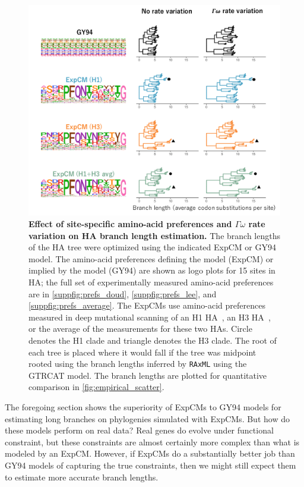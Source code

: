 \documentclass[11pt]{article}
\begin{document}
\begin{figure}
\centerline{\includegraphics[width=\textwidth]{figures/empirical_trees.pdf}}
\caption{\label{fig:empirical_trees}
\textbf{Effect of site-specific amino-acid preferences and $\Gamma\omega$ rate variation on HA branch length estimation.} 
The branch lengths of the HA tree were optimized using the indicated ExpCM or GY94 model. 
The amino-acid preferences defining the model (ExpCM) or implied by the model (GY94) are shown as logo plots for 15 sites in HA; the full set of experimentally measured amino-acid preferences are in \ref{suppfig:prefs_doud}, \ref{suppfig:prefs_lee}, and \ref{suppfig:prefs_average}. 
The ExpCMs use amino-acid preferences measured in deep mutational scanning of an H1 HA~\citep{doud2016accurate}, an H3 HA~\citep{lee2018deep}, or the average of the measurements for these two HAs.
Circle denotes the H1 clade and triangle denotes the H3 clade.
The root of each tree is placed where it would fall if the tree was midpoint rooted using the branch lengths inferred by \texttt{RAxML} using the GTRCAT model. 
The branch lengths are plotted for quantitative comparison in \ref{fig:empirical_scatter}. 
}
\end{figure}

The foregoing section shows the superiority of ExpCMs to GY94 models for estimating long branches on phylogenies simulated with ExpCMs.
But how do these models perform on real data?
Real genes do evolve under functional constraint, but these constraints are almost certainly more complex than what is modeled by an ExpCM.
However, if ExpCMs do a substantially better job than GY94 models of capturing the true constraints, then we might still expect them to estimate more accurate branch lengths.
\end{document}
